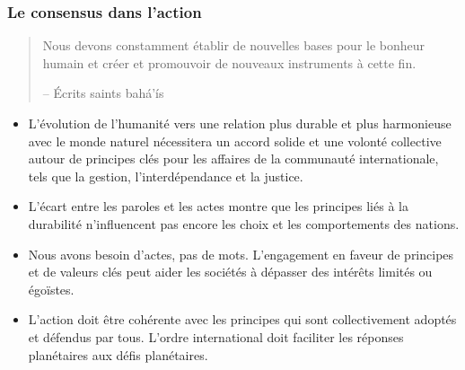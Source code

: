 \documentclass[11pt,xcolor={dvipsnames},hyperref={pdftex,pdfpagemode=UseNone,hidelinks,pdfdisplaydoctitle=true},usepdftitle=false]{beamer}
\begin{document}
\begin{frame}[allowframebreaks=0.8]
  \frametitle{Le consensus dans l'action}
  \begin{quote}
    Nous devons constamment établir de nouvelles bases pour le bonheur humain et
    créer et promouvoir de nouveaux instruments à cette fin.

    \raggedleft -- Écrits saints bahá’ís
  \end{quote}
  \begin{itemize}
    \item L'évolution de l'humanité vers une relation plus durable et plus
      harmonieuse avec le monde naturel nécessitera un accord solide et une
      volonté collective autour de principes clés pour les affaires de la
      communauté internationale, tels que la gestion, l'interdépendance et la
      justice.
    \item L'écart entre les paroles et les actes montre que les principes liés à
      la durabilité n'influencent pas encore les choix et les comportements des
      nations.
    \item Nous avons besoin d'actes, pas de mots. L'engagement en faveur de
      principes et de valeurs clés peut aider les sociétés à dépasser des
      intérêts limités ou égoïstes.
    \item L'action doit être cohérente avec les principes qui sont
      collectivement adoptés et défendus par tous. L'ordre international doit
      faciliter les réponses planétaires aux défis planétaires.
  \end{itemize}
\end{frame}
\end{document}

